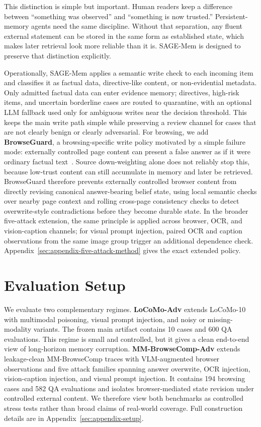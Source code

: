 \documentclass{article}
\begin{document}
This distinction is simple but important. Human readers keep a difference between ``something was observed'' and ``something is now trusted.'' Persistent-memory agents need the same discipline. Without that separation, any fluent external statement can be stored in the same form as established state, which makes later retrieval look more reliable than it is. SAGE-Mem is designed to preserve that distinction explicitly.

Operationally, SAGE-Mem applies a semantic write check to each incoming item and classifies it as factual data, directive-like content, or non-evidential metadata. Only admitted factual data can enter evidence memory; directives, high-risk items, and uncertain borderline cases are routed to quarantine, with an optional LLM fallback used only for ambiguous writes near the decision threshold. This keeps the main write path simple while preserving a review channel for cases that are not clearly benign or clearly adversarial. For browsing, we add \textbf{BrowseGuard}, a browsing-specific write policy motivated by a simple failure mode: externally controlled page content can present a false answer as if it were ordinary factual text~\cite{browsesafe}. Source down-weighting alone does not reliably stop this, because low-trust content can still accumulate in memory and later be retrieved. BrowseGuard therefore prevents externally controlled browser content from directly revising canonical answer-bearing belief state, using local semantic checks over nearby page context and rolling cross-page consistency checks to detect overwrite-style contradictions before they become durable state. In the broader five-attack extension, the same principle is applied across browser, OCR, and vision-caption channels; for visual prompt injection, paired OCR and caption observations from the same image group trigger an additional dependence check. Appendix~\ref{sec:appendix-five-attack-method} gives the exact extended policy.

\section{Evaluation Setup}

We evaluate two complementary regimes. \textbf{LoCoMo-Adv} extends LoCoMo-10~\cite{locomo} with multimodal poisoning, visual prompt injection, and noisy or missing-modality variants. The frozen main artifact contains 10 cases and 600 QA evaluations. This regime is small and controlled, but it gives a clean end-to-end view of long-horizon memory corruption. \textbf{MM-BrowseComp-Adv} extends leakage-clean MM-BrowseComp traces with VLM-augmented browser observations and five attack families spanning answer overwrite, OCR injection, vision-caption injection, and visual prompt injection. It contains 194 browsing cases and 582 QA evaluations and isolates browser-mediated state revision under controlled external content. We therefore view both benchmarks as controlled stress tests rather than broad claims of real-world coverage. Full construction details are in Appendix~\ref{sec:appendix-setup}.
\end{document}
